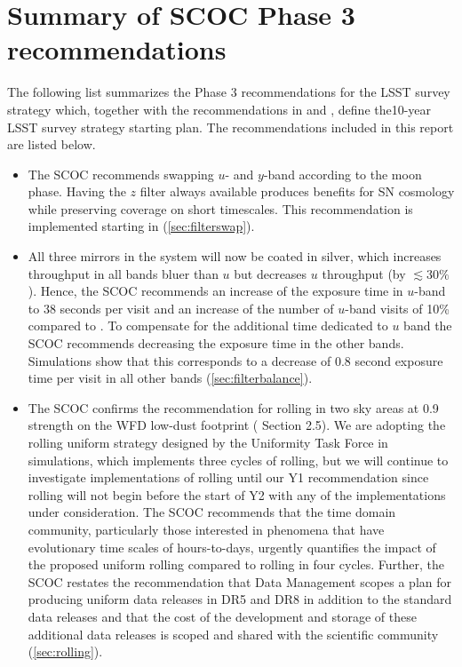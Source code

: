 \section{Summary of SCOC Phase 3 recommendations}\label{sec:summary}
The following list summarizes the Phase 3 recommendations for the LSST survey strategy which, together with the recommendations in  and , define the10-year LSST survey strategy starting plan.   The recommendations included in this report are listed below.

\begin{itemize}
\item The SCOC recommends swapping $u$- and $y$-band according to the moon phase. Having the $z$ filter always available  produces benefits for SN cosmology while preserving coverage on short timescales. This recommendation is implemented starting in  (\autoref{sec:filterswap}).




\item All three mirrors in the system will now be coated in silver, which increases throughput in all bands bluer than $u$ but decreases $u$ throughput (by $\lesssim30\%$). Hence, the SCOC recommends an increase of the exposure time in $u$-band to 38 seconds per visit and an increase of the number of $u$-band visits of 10\% compared to . To compensate for the additional time dedicated to $u$ band the SCOC recommends decreasing the exposure time in the other bands. Simulations show that this corresponds to a decrease of 0.8 second exposure time per visit in all other bands (\autoref{sec:filterbalance}).

\item {The SCOC confirms the recommendation for rolling in two sky areas at 0.9 strength on the WFD low-dust footprint ( Section 2.5). We are adopting the rolling uniform strategy designed by the Uniformity Task Force in  simulations, which implements three cycles of rolling, but we will continue to investigate implementations of rolling until our Y1 recommendation since rolling will not begin before the start of Y2 with any of the implementations under consideration.  The SCOC recommends that the time domain community, particularly those interested in phenomena that have evolutionary time scales of hours-to-days, urgently quantifies the impact of the proposed uniform rolling compared to rolling in four cycles. Further, the SCOC restates the recommendation that Data Management scopes a plan for producing uniform data releases in DR5 and DR8 in addition to the standard data releases and that the cost of the development and storage of these additional data releases is scoped and shared with the scientific community (\autoref{sec:rolling}).} 


\end{itemize}
